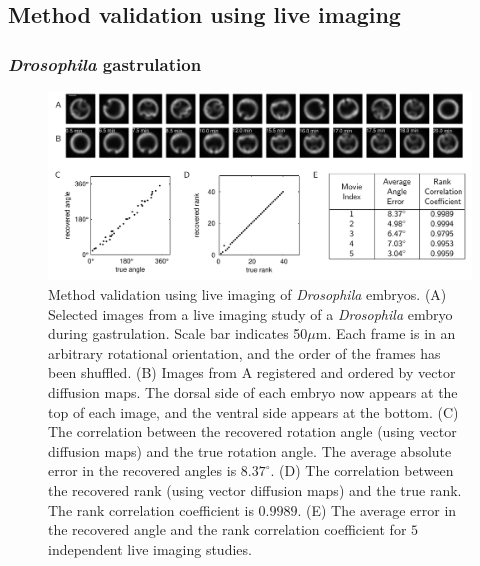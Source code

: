 \subsection{Method validation using live imaging}

\subsubsection{{\em Drosophila} gastrulation}

\begin{figure}[t]
\includegraphics[width=\textwidth]{fig3}
\caption[Method validation using live imaging of \textit{Drosophila} embryos]{Method validation using live imaging of \textit{Drosophila} embryos. (A) Selected images from a live imaging study of a \textit{Drosophila} embryo during gastrulation. Scale bar indicates 50$\mu$m. Each frame is in an arbitrary rotational orientation, and the order of the frames has been shuffled. (B) Images from A registered and ordered by vector diffusion maps. The dorsal side of each embryo now appears at the top of each image, and the ventral side appears at the bottom. (C) The correlation between the recovered rotation angle (using vector diffusion maps) and the true rotation angle. The average absolute error in the recovered angles is $8.37 ^\circ$. (D) The correlation between the recovered rank (using vector diffusion maps) and the true rank. The rank correlation coefficient is $0.9989$. (E) The average error in the recovered angle and the rank correlation coefficient for $5$ independent live imaging studies. }
\label{fig:drosophila_live_imaging}
\end{figure}

